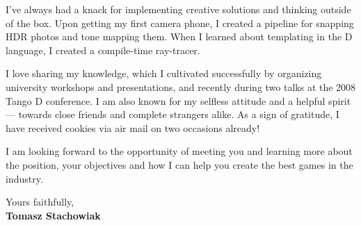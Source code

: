 \documentclass[11pt]{article}
\begin{document}
I've always had a knack for implementing creative solutions and thinking outside of the box. Upon getting my first camera phone, I created a pipeline for snapping HDR photos and tone mapping them. When I learned about templating in the D language, I created a compile-time ray-tracer.

I love sharing my knowledge, which I cultivated successfully by organizing university workshops and presentations, and recently during two talks at the 2008 Tango D conference. I am also known for my selfless attitude and a helpful spirit --- towards close friends and complete strangers alike. As a sign of gratitude, I have received cookies via air mail on two occasions already!

I am looking forward to the opportunity of meeting you and learning more about the position, your objectives and how I can help you create the best games in the industry.
  
Yours faithfully,\\[2em] %
%
{\bfseries Tomasz Stachowiak}
%
\end{document}
